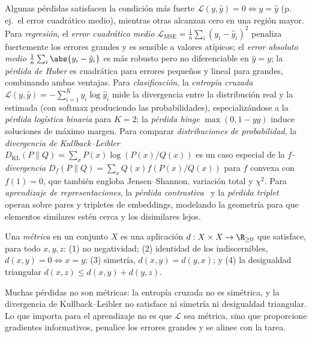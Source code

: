Algunas p\'erdidas satisfacen la condici\'on m\'as fuerte $\mathcal{L}(y, \hat{y})
= 0 \Leftrightarrow y = \hat{y}$ (p.\,ej.\ el error cuadr\'atico medio), mientras
otras alcanzan cero en una regi\'on mayor. Para \emph{regresi\'on}, el \emph{error
cuadr\'atico medio} $\mathcal{L}_{\mathrm{MSE}} = \frac{1}{n}\sum_i (y_i -
\hat{y}_i)^2$ penaliza fuertemente los errores grandes y es sensible a valores
at\'ipicos; el \emph{error absoluto medio} $\frac{1}{n}\sum_i \abs{y_i - \hat{y}_i}$
es m\'as robusto pero no diferenciable en $\hat{y} = y$; la \emph{p\'erdida de
Huber} es cuadr\'atica para errores peque\~nos y lineal para grandes, combinando
ambas ventajas. Para \emph{clasificaci\'on}, la \emph{entrop\'ia cruzada}
$\mathcal{L}(y, \hat{y}) = -\sum_{i=1}^K y_i \log \hat{y}_i$ mide la divergencia
entre la distribuci\'on real y la estimada (con softmax produciendo las
probabilidades), especializ\'andose a la \emph{p\'erdida log\'istica binaria} para
$K = 2$; la \emph{p\'erdida hinge} $\max(0, 1 - y\hat{y})$ induce soluciones de
m\'aximo margen. Para comparar \emph{distribuciones de probabilidad}, la
\emph{divergencia de Kullback--Leibler} $D_{\mathrm{KL}}(P \| Q) = \sum_x P(x)
\log(P(x)/Q(x))$ es un caso especial de la \emph{$f$-divergencia} $D_f(P \| Q) =
\sum_x Q(x) f(P(x)/Q(x))$ para $f$ convexa con $f(1) = 0$, que tambi\'en engloba
Jensen--Shannon, variaci\'on total y $\chi^2$. Para \emph{aprendizaje de
representaciones}, la \emph{p\'erdida contrastiva}~\citep{hadsell2006dimensionality}
y la \emph{p\'erdida triplet}~\citep{schroff2015facenet} operan sobre pares y
tripletes de embeddings, modelando la geometr\'ia para que elementos similares
est\'en cerca y los disimilares lejos.

\begin{definition}[M\'etrica]
\label{def:found:metric}
Una \emph{m\'etrica} en un conjunto $X$ es una aplicaci\'on $d : X \times X \to
\R_{\ge 0}$ que satisface, para todo $x, y, z$: (1) no negatividad; (2) identidad
de los indiscernibles, $d(x,y) = 0 \Leftrightarrow x = y$; (3) simetr\'ia,
$d(x,y) = d(y,x)$; y (4) la desigualdad triangular $d(x,z) \le d(x,y) + d(y,z)$.
\end{definition}

Muchas p\'erdidas no son m\'etricas: la entrop\'ia cruzada no es sim\'etrica, y la
divergencia de Kullback--Leibler no satisface ni simetr\'ia ni desigualdad
triangular. Lo que importa para el aprendizaje no es que $\mathcal{L}$ sea
m\'etrica, sino que proporcione gradientes informativos, penalice los errores
grandes y se alinee con la tarea.

